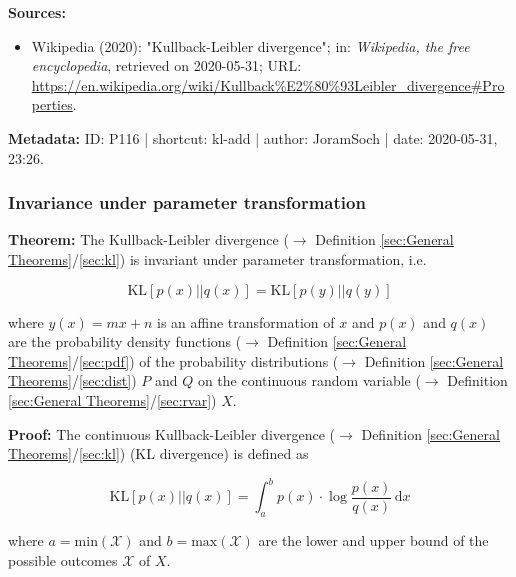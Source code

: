 \documentclass[a4paper,12pt,twoside]{book}
\begin{document}
\vspace{1em}
\textbf{Sources:}
\begin{itemize}
\item Wikipedia (2020): "Kullback-Leibler divergence"; in: \textit{Wikipedia, the free encyclopedia}, retrieved on 2020-05-31; URL: \url{https://en.wikipedia.org/wiki/Kullback%E2%80%93Leibler_divergence#Properties}.
\end{itemize}


\vspace{1em}
\textbf{Metadata:} ID: P116 | shortcut: kl-add | author: JoramSoch | date: 2020-05-31, 23:26.
\vspace{1em}



\subsubsection[\textbf{Invariance under parameter transformation}]{Invariance under parameter transformation} \label{sec:kl-inv}
\setcounter{equation}{0}

\textbf{Theorem:} The Kullback-Leibler divergence ($\rightarrow$ Definition \ref{sec:General Theorems}/\ref{sec:kl}) is invariant under parameter transformation, i.e.

\begin{equation} \label{eq:kl-inv-KL-inv}
\mathrm{KL}[p(x)||q(x)] = \mathrm{KL}[p(y)||q(y)]
\end{equation}

where $y(x) = mx + n$ is an affine transformation of $x$ and $p(x)$ and $q(x)$ are the probability density functions ($\rightarrow$ Definition \ref{sec:General Theorems}/\ref{sec:pdf}) of the probability distributions ($\rightarrow$ Definition \ref{sec:General Theorems}/\ref{sec:dist}) $P$ and $Q$ on the continuous random variable ($\rightarrow$ Definition \ref{sec:General Theorems}/\ref{sec:rvar}) $X$.


\vspace{1em}
\textbf{Proof:} The continuous Kullback-Leibler divergence ($\rightarrow$ Definition \ref{sec:General Theorems}/\ref{sec:kl}) (KL divergence) is defined as

\begin{equation} \label{eq:kl-inv-KL}
\mathrm{KL}[p(x)||q(x)] = \int_{a}^{b} p(x) \cdot \log \frac{p(x)}{q(x)} \, \mathrm{d}x
\end{equation}

where $a = \mathrm{min}(\mathcal{X})$ and $b = \mathrm{max}(\mathcal{X})$ are the lower and upper bound of the possible outcomes $\mathcal{X}$ of $X$.
\end{document}
